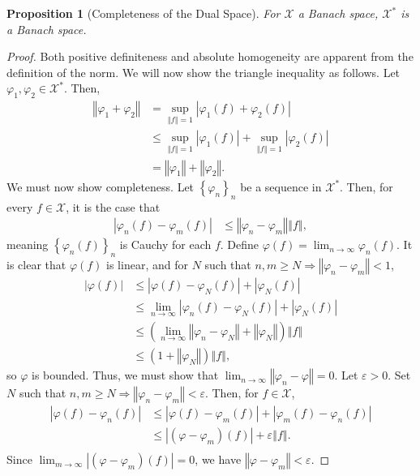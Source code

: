 \documentclass[12pt]{extarticle}
\newcommand{\norm}[1]{\left\Vert #1\right\Vert}
\newcommand{\set}[1]{\left\{#1\right\}}
\newcommand{\ve}{\varepsilon}
\theoremstyle{plain}
\newtheorem*{proposition}{Proposition}
\theoremstyle{definition}
\theoremstyle{note}
\begin{document}
\begin{proposition}[Completeness of the Dual Space]
  For $\mathcal{X}$ a Banach space, $\mathcal{X}^{\ast}$ is a Banach space.
\end{proposition}
\begin{proof}
  Both positive definiteness and absolute homogeneity are apparent from the definition of the norm. We will now show the triangle inequality as follows. Let $\varphi_1,\varphi_2\in \mathcal{X}^{\ast}$. Then,
  \begin{align*}
    \norm{\varphi_1 + \varphi_2} &= \sup_{\norm{f} = 1}\left\vert \varphi_1\left(f\right) +  \varphi_{2}\left(f\right)\right\vert\\
                                 &\leq \sup_{\norm{f} = 1}\left\vert \varphi_1(f) \right\vert + \sup_{\norm{f} = 1}\left\vert \varphi_2(f) \right\vert\\
                                 &= \norm{\varphi_1} + \norm{\varphi_2}.
  \end{align*}
  We must now show completeness. Let $\set{\varphi_n}_n$ be a sequence in $\mathcal{X}^{\ast}$. Then, for every $f\in \mathcal{X}$, it is the case that
  \begin{align*}
    \left\vert \varphi_n(f) - \varphi_m(f) \right\vert &\leq \norm{\varphi_n - \varphi_m}\norm{f},
  \end{align*}
  meaning $\set{\varphi_n(f)}_n$ is Cauchy for each $f$. Define $\varphi(f) = \lim_{n\rightarrow\infty}\varphi_n(f)$. It is clear that $\varphi(f)$ is linear, and for $N$ such that $n,m \geq N \Rightarrow \norm{\varphi_n - \varphi_m} < 1$,
  \begin{align*}
    \left\vert \varphi(f) \right\vert &\leq \left\vert \varphi(f) - \varphi_N(f) \right\vert + \left\vert \varphi_N(f) \right\vert\\
                                      &\leq \lim_{n\rightarrow\infty}\left\vert \varphi_n(f) - \varphi_N(f) \right\vert + \left\vert \varphi_N(f) \right\vert\\
                                      &\leq \left(\lim_{n\rightarrow\infty}\norm{\varphi_n - \varphi_N} + \norm{\varphi_N}\right)\norm{f}\\
                                      &\leq \left(1 + \norm{\varphi_N}\right)\norm{f},
  \end{align*}
  so $\varphi$ is bounded. Thus, we must show that $\lim_{n\rightarrow\infty}\norm{\varphi_n - \varphi} = 0$. Let $\ve > 0$. Set $N$ such that $n,m\geq N \Rightarrow \norm{\varphi_n - \varphi_m} < \ve$. Then, for $f\in \mathcal{X}$,
  \begin{align*}
    \left\vert \varphi(f) - \varphi_n(f) \right\vert &\leq \left\vert \varphi(f) - \varphi_m(f) \right\vert + \left\vert \varphi_m(f) - \varphi_n(f) \right\vert\\
                                                     &\leq \left\vert (\varphi - \varphi_m)(f) \right\vert + \ve\norm{f}.\\
  \end{align*}
  Since $\lim_{m\rightarrow\infty}\left\vert \left(\varphi - \varphi_m\right)(f) \right\vert = 0$, we have $\norm{\varphi - \varphi_m} < \ve$.
\end{proof}
\end{document}

